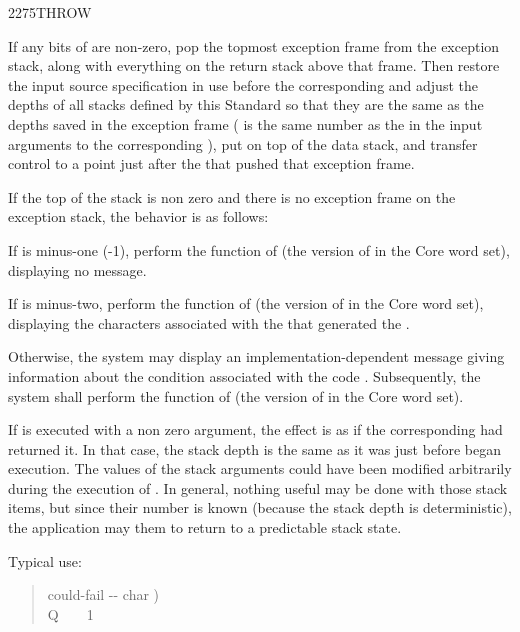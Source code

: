 \begin{worddef}{2275}{THROW}
\item {}

	If any bits of  are non-zero, pop the topmost exception
	frame from the exception stack, along with everything on the
	return stack above that frame. Then restore the input source
	specification in use before the corresponding 
	and adjust the depths of all stacks defined by this Standard
	so that they are the same as the depths saved in the exception
	frame ( is the same number as the  in the input
	arguments to the corresponding ), put  on
	top of the data stack, and transfer control to a point just after
	the  that pushed that exception frame.

	If the top of the stack is non zero and there is no exception
	frame on the exception stack, the behavior is as follows:

	If  is minus-one (-1), perform the function of
	 (the version of  in
	the Core word set), displaying no message.

	If  is minus-two, perform the function of
	 (the version of 
	in the Core word set), displaying the characters 
	associated with the  that generated the
	.

	Otherwise, the system may display an implementation-dependent
	message giving information about the condition associated with
	the  code . Subsequently, the system shall
	perform the function of  (the version
	of  in the Core word set).

\begin{defer}
\rationale %
	If  is executed with a non zero argument, the effect
	is as if the corresponding  had returned it. In that
	case, the stack depth is the same as it was just before 
	began execution. The values of the  stack arguments could
	have been modified arbitrarily during the execution of .
	In general, nothing useful may be done with those stack items, but
	since their number is known (because the stack depth is deterministic),
	the application may  them to return to a predictable
	stack state.

	Typical use:
	\begin{quote}\ttfamily
		\word{:} could-fail  -{}- char ) \\
		\tab {}  \word{[CHAR]} Q \word{=}~
			~ 1 
		\word{;}


\end{quote}
\end{defer}
\end{worddef}
